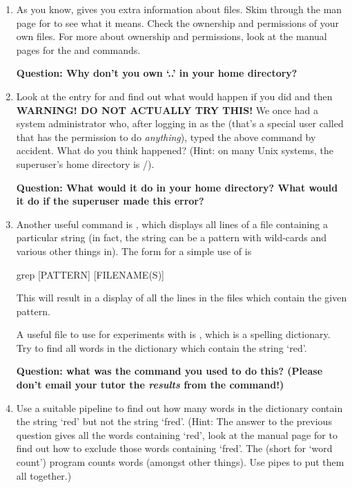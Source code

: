 %
\begin{enumerate}
%
%
\item As you know,  gives you extra information
 about files. Skim through the man page for  to see what
 it means. Check the ownership and permissions of your
 own files. For more
 about ownership and permissions, look at the manual pages for the
  and  commands.

 \textbf{Question: Why don't you own `..'  in your home directory?}

%
\item Look at the  entry for   and find out
  what would happen if you did  and then  
  \\ 
  \textbf{WARNING! DO NOT ACTUALLY TRY THIS!}  We once had a system administrator who, after
  logging in as the  (that's a special user called
   that has the permission to do \emph{anything}), typed
  the above command by accident. What do you think happened? (Hint: on
  many Unix systems, the superuser's home directory is /).

\textbf{Question: What would it do in your home directory? What would it do if the
  superuser made this error?}

\item Another useful command is , which displays all
  lines of a file containing a particular string (in fact, the
  string can be a pattern with wild-cards and various other things in).
  The form for a simple use of  is
\begin{ttoutenv}
  grep [PATTERN] [FILENAME(S)]
\end{ttoutenv}
%
This will result in a display of all the lines in the files which
contain the given pattern.

A useful file to use for experiments with  is
, which is a spelling dictionary. Try to
find all words 
in the dictionary which contain the string `red'.

  \textbf{Question: what was the command you used to do this? (Please don't email your
  tutor the \emph{results} from the command!)}

\item 
  Use a suitable pipeline to find out how many
  words in the dictionary contain the string `red' but not the
  string `fred'.  (Hint: The answer to the previous question gives all
  the words containing `red', look at the manual page for
   to find out how to exclude those words containing
  `fred'. The  (short for `word count') program counts words
  (amongst other things). Use pipes to put them all together.)


\end{enumerate}

